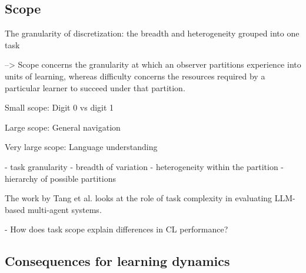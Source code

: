 \documentclass{article}
\begin{document}
            \subsection{Scope}
            
    
            The granularity of discretization: the breadth and heterogeneity grouped into one task
            
        
            
    
            --> Scope concerns the granularity at which an observer partitions experience into units of learning, whereas difficulty concerns the resources required by a particular learner to succeed under that partition.
            
    
            Small scope: Digit 0 vs digit 1
            
            Large scope: General navigation
            
            Very large scope: Language understanding

            - task granularity
            - breadth of variation
            - heterogeneity within the partition
            - hierarchy of possible partitions
            


            The work by Tang et al. \cite{tang2025importancetaskcomplexityevaluating} looks at the role of task complexity in evaluating LLM-based multi-agent systems.

            - How does task scope explain differences in CL performance?


        \subsection{Consequences for learning dynamics}
\end{document}
